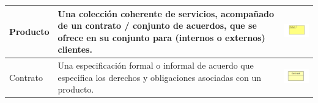 \begin{table}[H]
\begin{tabular}{| m{3cm} | m{7cm} | m{3.8cm} |}
		Producto                 & Una colección coherente de servicios, acompañado de un contrato / conjunto de acuerdos, que se ofrece en su conjunto para (internos o externos) clientes.                           &\vspace{1.52mm}\includegraphics[width=40mm, height=10mm]{imgs/conceptos/negocio/Product.pdf}         \\ \hline
		
		Contrato                 & Una especificación formal o informal de acuerdo que especifica los derechos y obligaciones asociadas con un producto.                                                                 &\vspace{1.52mm}\includegraphics[width=40mm, height=10mm]{imgs/conceptos/negocio/Contract.pdf}       \\ \hline
		
	\end{tabular}
\end{table}